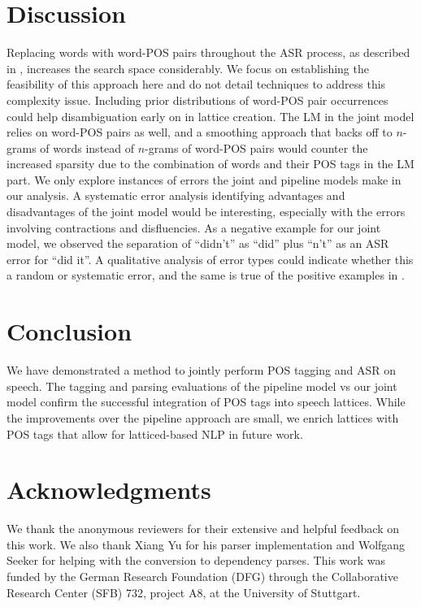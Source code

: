 \documentclass[11pt,letterpaper]{article}
\begin{document}
\section{Discussion}
Replacing words with word-POS pairs throughout the ASR process, as described in , increases the search space considerably. We focus on establishing the feasibility of this approach here and do not detail techniques to address this complexity issue. Including prior distributions of word-POS pair occurrences could help disambiguation early on in lattice creation. The LM in the joint model relies on word-POS pairs as well, and a smoothing approach that backs off to $n$-grams of words instead of $n$-grams of word-POS pairs would counter the increased sparsity due to the combination of words and their POS tags in the LM part. We only explore instances of errors the joint and pipeline models make in our analysis. A systematic error analysis identifying advantages and disadvantages of the joint model would be interesting, especially with the errors involving contractions and disfluencies. As a negative example for our joint model, we observed the separation of ``didn't'' as ``did'' plus ``n't'' as an ASR error for ``did it''. A qualitative analysis of error types could indicate whether this a random or systematic error, and the same is true of the positive examples in .

\section{Conclusion}\label{sec:concl}
We have demonstrated a method to jointly perform POS tagging and ASR on speech. The tagging and parsing evaluations of the pipeline model vs our joint model confirm the successful integration of POS tags into speech lattices. While the improvements over the pipeline approach are small, we enrich lattices with POS tags that allow for latticed-based NLP in future work.

\section*{Acknowledgments}
We thank the anonymous reviewers for their extensive and helpful feedback on this work. We also thank Xiang Yu for his parser implementation and Wolfgang Seeker for helping with the conversion to dependency parses. This work was funded by the German Research Foundation (DFG) through the Collaborative Research Center (SFB) 732, project A8, at the University of Stuttgart.



\end{document}
